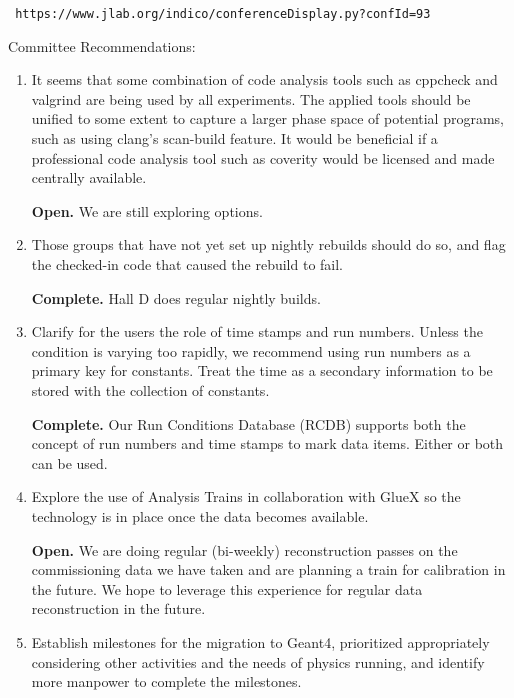 \documentclass[12pt]{article}
\begin{document}
\begin{center}\tt
https://www.jlab.org/indico/conferenceDisplay.py?confId=93
\end{center}

Committee Recommendations:

\begin{enumerate}

\item It seems that some combination of code analysis tools such as
  cppcheck and valgrind are being used by all experiments. The applied
  tools should be unified to some extent to capture a larger phase
  space of potential programs, such as using clang's scan-build
  feature. It would be beneficial if a professional code analysis tool
  such as coverity would be licensed and made centrally available.

  {\bf Open.} We are still exploring options.

\item Those groups that have not yet set up nightly rebuilds should do
  so, and flag the checked-in code that caused the rebuild to fail.

  {\bf Complete.} Hall D does regular nightly builds.

\item Clarify for the users the role of time stamps and run
  numbers. Unless the condition is varying too rapidly, we recommend
  using run numbers as a primary key for constants. Treat the time as
  a secondary information to be stored with the collection of
  constants.

  {\bf Complete.} Our Run Conditions Database (RCDB) supports both the
  concept of run numbers and time stamps to mark data items. Either or
  both can be used.

\item Explore the use of Analysis Trains in collaboration with GlueX
  so the technology is in place once the data becomes available.

  {\bf Open.} We are doing regular (bi-weekly) reconstruction passes
  on the commissioning data we have taken and are planning a train for
  calibration in the future. We hope to leverage this experience for
  regular data reconstruction in the future.

\item Establish milestones for the migration to Geant4, prioritized
  appropriately considering other activities and the needs of physics
  running, and identify more manpower to complete the milestones.


\end{enumerate}
\end{document}

